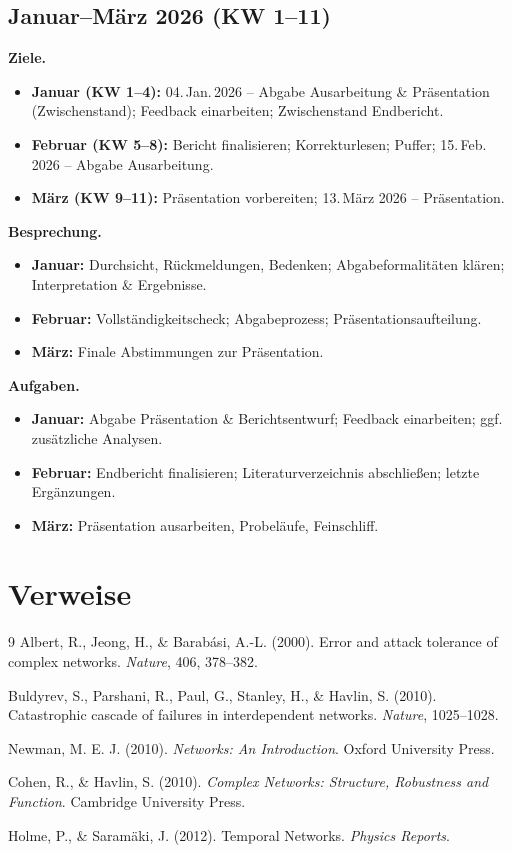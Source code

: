 \documentclass[12pt]{article} %
\begin{document}
\subsection*{Januar–März 2026 (KW 1–11)}

\textbf{Ziele.}
\begin{itemize}
  \item \textbf{Januar (KW 1–4):} 04.\,Jan.\,2026 – Abgabe Ausarbeitung \& Präsentation (Zwischenstand); 
        Feedback einarbeiten; Zwischenstand Endbericht. 
  \item \textbf{Februar (KW 5–8):} Bericht finalisieren; Korrekturlesen; Puffer; 
        15.\,Feb.\,2026 – Abgabe Ausarbeitung.
  \item \textbf{März (KW 9–11):} Präsentation vorbereiten; 13.\,März 2026 – Präsentation.
\end{itemize}

\textbf{Besprechung.}
\begin{itemize}
  \item \textbf{Januar:} Durchsicht, Rückmeldungen, Bedenken; Abgabeformalitäten klären; Interpretation \& Ergebnisse. 
  \item \textbf{Februar:} Vollständigkeitscheck; Abgabeprozess; Präsentationsaufteilung.
  \item \textbf{März:} Finale Abstimmungen zur Präsentation.
\end{itemize}

\textbf{Aufgaben.}
\begin{itemize}
  \item \textbf{Januar:} Abgabe Präsentation \& Berichtsentwurf; Feedback einarbeiten; ggf. zusätzliche Analysen.
  \item \textbf{Februar:} Endbericht finalisieren; Literaturverzeichnis abschließen; letzte Ergänzungen.
  \item \textbf{März:} Präsentation ausarbeiten, Probeläufe, Feinschliff.
\end{itemize}



\section{Verweise}
\begin{thebibliography}{9}
Albert, R., Jeong, H., \& Barabási, A.-L. (2000). Error and attack tolerance of complex networks. \textit{Nature}, 406, 378–382.

Buldyrev, S., Parshani, R., Paul, G., Stanley, H., \& Havlin, S. (2010). Catastrophic cascade of failures in interdependent networks. \textit{Nature}, 1025–1028.

Newman, M. E. J. (2010). \textit{Networks: An Introduction}. Oxford University Press.

Cohen, R., \& Havlin, S. (2010). \textit{Complex Networks: Structure, Robustness and Function}. Cambridge University Press.

Holme, P., \& Saramäki, J. (2012). Temporal Networks. \textit{Physics Reports}.
\end{thebibliography}
\end{document}
